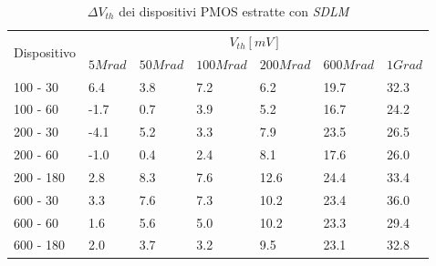 \documentclass[12pt, letterpaper]{book}
\begin{document}
\begin{table}[H]
  \renewcommand{\arraystretch}{1.3}
    \begin{tabular}{m{2cm}  m{1.1cm} m{1.3cm} m{1.5cm} m{1.5cm} m{1.5cm} m{1cm}}
      \toprule
      \multirow{2}{*}{Dispositivo} & \multicolumn{6}{c}{$V_{th} [mV] $}                                                                    \\
      \cmidrule{2-7}
                                   & $5Mrad$ & $50Mrad$ & $100Mrad$ & $200Mrad$ & $600Mrad$ & $1Grad$ \\
      \midrule
	100 - 30				& 6.4		& 3.8		& 7.2		& 6.2		& 19.7		& 32.3\\
      \hline
      100 - 60				& -1.7		& 0.7		& 3.9		& 5.2		& 16.7		& 24.2   \\
      \hline
      200 - 30				& -4.1		& 5.2		& 3.3		& 7.9		& 23.5 		& 26.5  \\
      \hline
      200 - 60				& -1.0		& 0.4 		& 2.4		& 8.1		& 17.6		& 26.0  \\
      \hline
      200 - 180			& 2.8 		& 8.3		& 7.6		& 12.6		& 24.4		& 33.4   \\
      \hline
      600 - 30				& 3.3		& 7.6		& 7.3		& 10.2 		& 23.4		& 36.0   \\
      \hline
      600 - 60				& 1.6		&5.6 		& 5.0		& 10.2		& 23.3		& 29.4  \\
      \hline
      600 - 180			& 2.0		& 3.7		& 3.2		& 9.5		& 23.1		& 32.8   \\
      \bottomrule
    \end{tabular}
  \caption{$\Delta V_{th}$ dei dispositivi PMOS estratte con \emph{SDLM}}
  \label{tab:deltaVthSDLMP}
\end{table}
\end{document}
